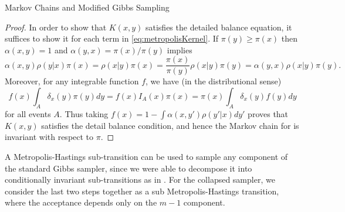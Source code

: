 \begin{chapter}{Markov Chains and Modified Gibbs Sampling}
\begin{proof}
In order to show that $K(x,y)$ satisfies the detailed balance equation, it suffices to show it for each term in \eqref{eq:metropolisKernel}.
If $\pi(y) \ge \pi(x)$ then $\alpha(x,y) = 1$ and $\alpha(y,x) = \pi(x)/\pi(y)$ implies 
\begin{equation}
  \alpha(x,y)\rho(y|x)\pi(x) = \rho(x|y)\pi(x) = \frac{\pi(x)}{\pi(y)}\rho(x|y)\pi(y) = \alpha(y,x)\rho(x|y)\pi(y).
\end{equation}
Moreover, for any integrable function $f$, we have (in the distributional sense)
\begin{equation}
  f(x)\int_A \delta_x(y) \pi(y)dy = f(x)I_A(x)\pi(x) = \pi(x)\int_A \delta_x(y) f(y)dy
\end{equation}
for all events $A$. 
Thus taking $f(x) = 1 - \int\alpha(x,y')\rho(y'|x)dy'$ proves that $K(x,y)$ satisfies the detail balance condition, and hence the Markov chain for  is invariant with respect to $\pi$.
\end{proof}

A Metropolis-Hastings sub-transition can be used to sample any component of the standard Gibbs sampler, since we were able to decompose it into conditionally invariant sub-transitions as in .
For the collapsed sampler, we consider the last two steps together as a sub Metropolis-Hastings transition, where the acceptance depends only on the $m-1$ component.


\end{chapter}
